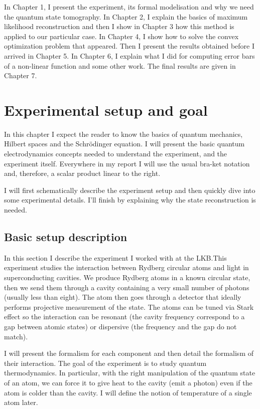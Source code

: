 \documentclass[10pt,a4paper]{report}
\theoremstyle{plain}
\theoremstyle{definition}
\theoremstyle{remark}
\begin{document}
In Chapter 1, I present the experiment, its formal modelisation and why we need
the quantum state tomography. In Chapter 2,
I explain the basics of maximum likelihood reconstruction and then I show in
Chapter 3 how this method is applied to our particular case. In Chapter 4, I show
how to solve the convex optimization problem that appeared. Then I present the
results obtained before I arrived in Chapter 5. In Chapter 6, I
explain what I did for computing error bars of a non-linear function and some other work.
The final results are given in Chapter 7.

\vfill



\chapter{Experimental setup and goal}

In this chapter I expect the reader to know the basics of quantum mechanics,
Hilbert spaces and
the Schrödinger equation. I will present the basic quantum electrodynamics
concepts needed to understand the experiment, and the experiment itself.
Everywhere in my report I will use the usual bra-ket notation
and, therefore, a scalar product linear to the right.

I will first schematically describe the experiment setup and then quickly dive
into some experimental details. I'll finish by explaining why the state
reconstruction is needed.

\section{Basic setup description}

In this section I describe the experiment I worked with at the LKB.\@ This
experiment studies the interaction between Rydberg circular atoms and light in
superconducting cavities.
We produce Rydberg atoms in a known circular state, then we send them through a
cavity containing a very small number of photons (usually less than
eight). The atom then goes through a detector that ideally performs projective
measurement of the state. The atoms can be tuned via Stark effect so the
interaction can be resonant (the cavity frequency correspond to a gap between
atomic states) or dispersive (the frequency and the gap do not match).

I will present the formalism for each component and then detail the formalism of
their interaction. The goal of the experiment is to study quantum
thermodynamics. In particular, with the right manipulation of the quantum state
of an atom, we can force it to give heat to the cavity (emit a photon) even if the atom
is colder than the cavity. I will define the notion of temperature of a single
atom later.
\end{document}
